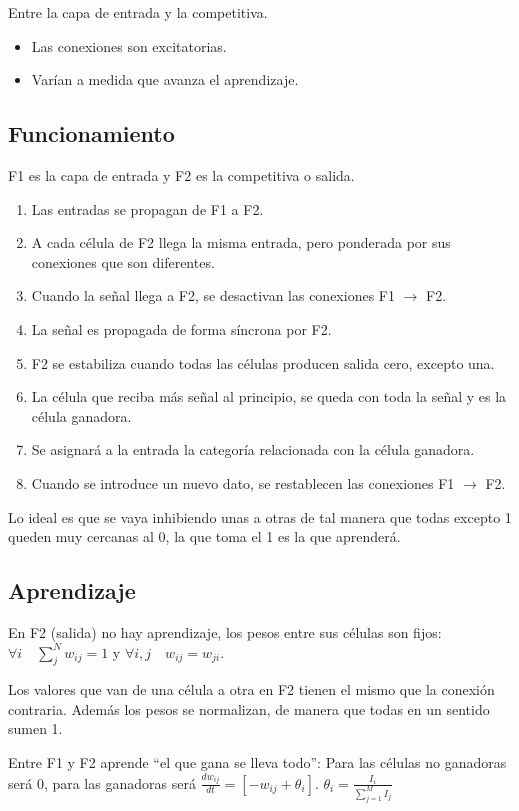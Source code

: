 \documentclass[12pt, twoside, openright]{report} %
\begin{document}
Entre la capa de entrada y la competitiva.
\begin{itemize}
	\item Las conexiones son excitatorias.
	\item Varían a medida que avanza el aprendizaje.
\end{itemize}

\subsection{Funcionamiento}
F1 es la capa de entrada y F2 es la competitiva o salida.
\begin{enumerate}
	\item Las entradas se propagan de F1 a F2.
	\item A cada célula de F2 llega la misma entrada, pero ponderada por sus conexiones que son diferentes.
	\item Cuando la señal llega a F2, se desactivan las conexiones F1 $\rightarrow$ F2.
	\item La señal es propagada de forma síncrona por F2.
	\item F2 se estabiliza cuando todas las células producen salida cero, excepto una.
	\item La célula que reciba más señal al principio, se queda con toda la señal y es la célula ganadora.
	\item Se asignará a la entrada la categoría relacionada con la célula ganadora.
	\item Cuando se introduce un nuevo dato, se restablecen las conexiones F1 $\rightarrow$ F2.
\end{enumerate}

Lo ideal es que se vaya inhibiendo unas a otras de tal manera que todas excepto 1 queden muy cercanas al 0, la que toma el 1 es la que aprenderá.

\subsection{Aprendizaje}
En F2 (salida) no hay aprendizaje, los pesos entre sus células son fijos: $\forall i \quad \sum^N_j w_{ij}=1$ y $\forall i, j \quad w_{ij}=w_{ji}$.

Los valores que van de una célula a otra en F2 tienen el mismo que la conexión contraria. Además los pesos se normalizan, de manera que todas en un sentido sumen 1.

Entre F1 y F2 aprende “el que gana se lleva todo”: Para las células no ganadoras será 0, para las ganadoras será $\frac{dw_{ij}}{dt}=[-w_{ij}+\theta_i]$. $\theta_i=\frac{I_i}{\sum_{j=1}^M I_j}$
\end{document}
